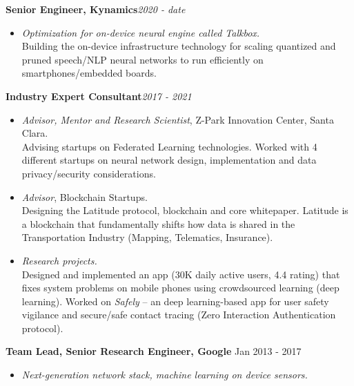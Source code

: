 \begin{resume}
    {\bf Senior Engineer, Kynamics}\hfill{\it 2020 - date}
    \begin{itemize}
        \item [] {\it Optimization for on-device neural engine called Talkbox. \\}
              Building the on-device infrastructure technology for scaling quantized and pruned speech/NLP neural
              networks to run efficiently on smartphones/embedded boards.
    \end{itemize}
    {\bf Industry Expert Consultant}\hfill{\it  2017 - 2021 }
    \begin{itemize}
        \item [] {\it Advisor, Mentor and Research Scientist}, Z-Park Innovation Center, Santa Clara. \\
            Advising startups on Federated Learning technologies. Worked with 4 different startups on neural network design,
            implementation and data privacy/security considerations.
        \item [] {\it Advisor}, Blockchain Startups. \\ 
            Designing the Latitude protocol, blockchain and core
            whitepaper. Latitude is a blockchain that fundamentally shifts how data is shared in the Transportation
            Industry (Mapping, Telematics, Insurance).
        \item [] {\it Research projects.} \\
            Designed and implemented an app (30K daily active users, 4.4 rating) that fixes system problems on mobile
            phones using crowdsourced learning (deep learning). Worked on {\em Safely} -- an deep learning-based app for user safety vigilance
            and secure/safe contact tracing (Zero Interaction Authentication protocol).
    \end{itemize}
    {\bf Team Lead, Senior Research Engineer, Google} \hfill{Jan 2013 - 2017}
    \begin{itemize}
        \item[] {\it Next-generation network stack, machine learning on device sensors.}\\


\end{itemize}
\end{resume}
